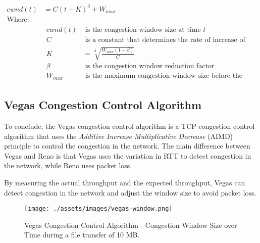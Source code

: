 \documentclass[a4paper, 11pt]{article}
\begin{document}
\begin{equation*}
	\begin{aligned}
		cwnd(t)       & = C(t - K)^3 + W_{max}                                                                             \\
		\text{Where:} &                                                                                                    \\
		              & \begin{aligned}
			                cwnd(t) & \text{ is the congestion window size at time } t                                         \\
			                C       & \text{ is a constant that determines the rate of increase of the congestion window size} \\
			                K       & = \sqrt[3]{\frac{W_{max}(1-\beta)}{C}}                                                   \\
			                \beta   & \text{ is the congestion window reduction factor}                                        \\
			                W_{max} & \text{ is the maximum congestion window size before the last congestion event}
		                \end{aligned}
	\end{aligned}
\end{equation*}

\pagebreak

\subsection{Vegas Congestion Control Algorithm}

To conclude, the Vegas congestion control algorithm is a TCP congestion control algorithm that uses the \textit{Additive Increase Multiplicative Decrease} (AIMD) principle to control the congestion in the network. The main difference between Vegas and Reno is that Vegas uses the variation in RTT to detect congestion in the network, while Reno uses packet loss. \cite{wiki:tcp_congestion_control}

By measuring the actual throughput and the expected throughput, Vegas can detect congestion in the network and adjust the window size to avoid packet loss.

\begin{figure}[h]
	\centering
	\texttt{[image: ./assets/images/vegas-window.png]}
	\caption{Vegas Congestion Control Algorithm - Congestion Window Size over Time during a file transfer of 10 MB.}
	\label{fig:vegas}
\end{figure}
\end{document}
